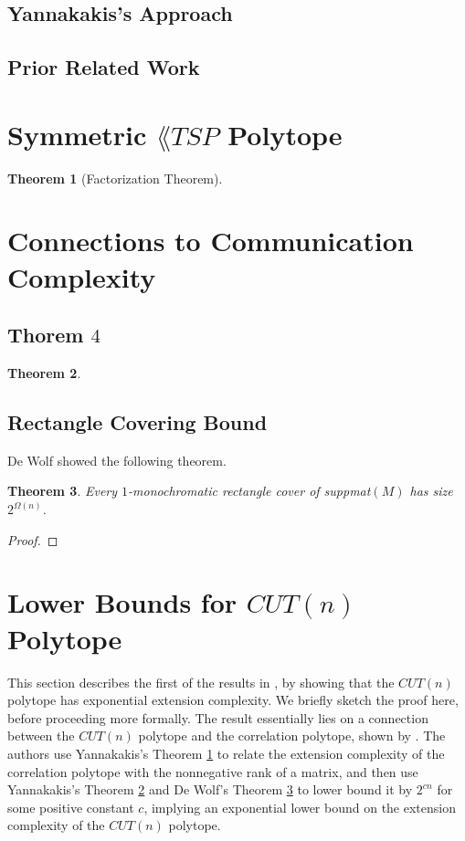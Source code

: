 \documentclass{article}
\newtheorem{theorem}{\sc Theorem}
\theoremstyle{definition}
\theoremstyle{remark}
\begin{document}
\subsection{Yannakakis's Approach}
\label{sec:Yannakakis}

\subsection{Prior Related Work}


\section{Symmetric $\lang{TSP}$ Polytope}

\begin{theorem}[Factorization Theorem]\label{theor:factor}
\end{theorem}

\section{Connections to Communication Complexity}

\subsection{Thorem $4$}\label{sec:theorem4}

\begin{theorem}\label{theor:suppmat}
\end{theorem}

\subsection{Rectangle Covering Bound}\label{sec:rec-cover}


De Wolf \cite{de-wolf} showed the following theorem.
\begin{theorem}\label{theor:dewolf}
Every $1$-monochromatic rectangle cover of suppmat$(M)$ has size $2^{\Omega(n)}$.
\end{theorem}
\begin{proof}
\end{proof}

\section{Lower Bounds for $CUT(n)$ Polytope}

This section describes the first of the results in \cite{fiorini}, by showing that the $CUT(n)$ polytope has exponential extension complexity. We briefly sketch the proof here, before proceeding more formally. The result essentially lies on a connection between the $CUT(n)$ polytope and the correlation polytope, shown by \cite{de-simone}. The authors use Yannakakis's Theorem \ref{theor:factor} to relate the extension complexity of the correlation polytope with the nonnegative rank of a matrix, and then use Yannakakis's Theorem \ref{theor:suppmat} and De Wolf's Theorem \ref{theor:dewolf} to lower bound it by $2^{cn}$ for some positive constant $c$, implying an exponential lower bound on the extension complexity of the $CUT(n)$ polytope.
\end{document}
